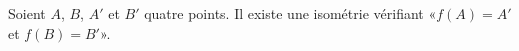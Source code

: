 Soient $A$, $B$, $A'$ et $B'$ quatre points. Il existe une isométrie vérifiant «$f(A)=A'$ et $f(B)=B'$».

\begin{reponses}
\end{reponses}

